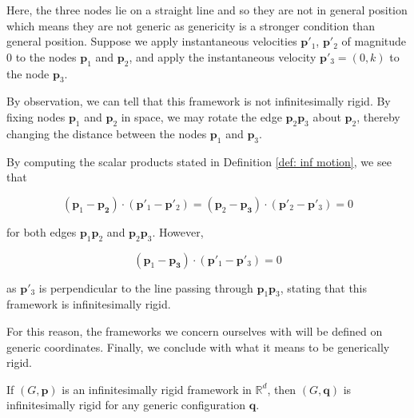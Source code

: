 \vspace{-2mm}
\begin{flushleft}
Here, the three nodes lie on a straight line and so they are not in general position which means they are not generic as genericity is a stronger condition than general position. Suppose we apply instantaneous velocities $\mathbf{p}'_1$, $\mathbf{p}'_2$ of magnitude 0 to the nodes $\mathbf{p}_1$ and $\mathbf{p}_2$, and apply the instantaneous velocity $\mathbf{p}'_3 = (0,k)$ to the node $\mathbf{p}_3$.
\end{flushleft}

\begin{flushleft}
By observation, we can tell that this framework is not infinitesimally rigid. By fixing nodes $\mathbf{p}_1$ and $\mathbf{p}_2$ in space, we may rotate the edge $\mathbf{p}_2\mathbf{p}_3$ about $\mathbf{p}_2$, thereby changing the distance between the nodes $\mathbf{p}_1$ and $\mathbf{p}_3$. 
\end{flushleft}

\begin{flushleft}
By computing the scalar products stated in Definition \ref{def: inf motion}, we see that 
\end{flushleft}
\vspace{-0.5mm}
\[
(\mathbf{p}_1 - \mathbf{p_2}) \cdot (\mathbf{p}'_1 - \mathbf{p}'_2) = (\mathbf{p}_2 - \mathbf{p_3}) \cdot (\mathbf{p}'_2 - \mathbf{p}'_3) = 0
\]

\begin{flushleft}
for both edges $\mathbf{p}_1\mathbf{p}_2$ and $\mathbf{p}_2\mathbf{p}_3$. However, 
\end{flushleft}
\vspace{-0.5mm}
\[
(\mathbf{p}_1 - \mathbf{p_3}) \cdot (\mathbf{p}'_1 - \mathbf{p}'_3) = 0
\]

\begin{flushleft}
as $\mathbf{p}'_3$ is perpendicular to the line passing through $\mathbf{p}_1\mathbf{p}_3$, stating that this framework is infinitesimally rigid. 
\end{flushleft}

\begin{flushleft}
For this reason, the frameworks we concern ourselves with will be defined on generic coordinates. Finally, we conclude with what it means to be generically rigid.    
\end{flushleft}

\begin{theorem}
\label{def: generic rigid}
If $(G,\mathbf{p})$ is an infinitesimally rigid framework in $\mathbb{R}^d$, then $(G,\mathbf{q})$ is infinitesimally rigid for any generic configuration $\mathbf{q}$.
\end{theorem}

